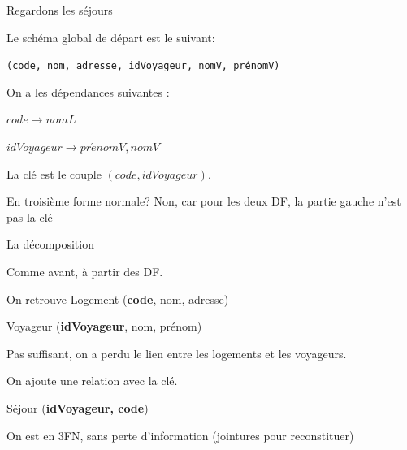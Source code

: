 \begin{frame}{Regardons les séjours}

Le schéma global de départ est le suivant:


\vfill
\begin{small}
\texttt{(code, nom, adresse, idVoyageur, nomV, prénomV)}
\end{small}
\vfill

On a les dépendances suivantes :
\begin{redbullet}
  \item $code \to nomL$
  \item $idVoyageur \to pr\acute{e}nomV, nomV$
\end{redbullet}

\vfill

La clé est le couple $(code, idVoyageur)$. 

\vfill
\begin{remblock}{En troisième forme normale?}
Non, car pour les \alert{deux}  DF,  la partie gauche n'est pas la clé
\end{remblock}
\end{frame}

\begin{frame}{La décomposition}

Comme avant, à partir des DF.

\vfill


\begin{redbullet}
  \item On retrouve Logement (\textbf{code}, nom, adresse) 
  \item Voyageur (\textbf{idVoyageur}, nom, prénom)
\end{redbullet}

\vfill

\alert{Pas suffisant}, on a perdu le lien entre les logements et les voyageurs.

\vfill
On ajoute une relation avec la clé.

\begin{redbullet}
  \item Séjour (\textbf{idVoyageur, code})
\end{redbullet}

\vfill
\alert{On est en 3FN, sans perte d'information (jointures pour reconstituer)}

\end{frame}

